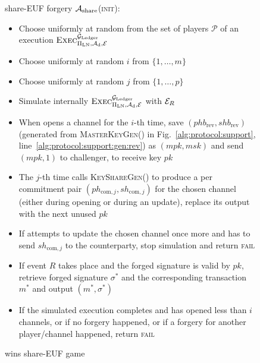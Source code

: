  \begin{figure}[!htbp]
    \begin{algobox}{\textsf{share-EUF} forgery}
      $\mathcal{A}_{\mathrm{share}}$(\textsc{init}):
      \begin{itemize}
        \item Choose uniformly at random \alice{} from the set of players
        $\mathcal{P}$ of an execution
        $\textsc{Exec}^{\mathcal{G}_{\mathrm{Ledger}}}_{\Pi_{\mathrm{LN}}, \mathcal{A}_{\mathrm{d}},
        \mathcal{E}}$
        \item Choose uniformly at random $i$ from $\{1, \dots, m\}$
        \item Choose uniformly at random $j$ from $\{1, \dots, p\}$
        \item Simulate internally
        $\textsc{Exec}^{\mathcal{G}_{\mathrm{Ledger}}}_{\Pi_{\mathrm{LN}}, \mathcal{A}_{\mathrm{d}},
        \mathcal{E}}$ with $\mathcal{E}_R$
        \item When \alice{} opens a channel for the $i$-th time,
        save $(phb_{\mathrm{rev}}, shb_{\mathrm{rev}})$ (generated from
        \textsc{MasterKeyGen}() in Fig.~\ref{alg:protocol:support},
        line~\ref{alg:protocol:support:gen:rev}) as $(mpk, msk)$ and send $(mpk,
        1)$ to challenger, to receive key $pk$
        \item The $j$-th time \alice{} calls \textsc{KeyShareGen}() to produce a
        per commitment pair $(ph_{\mathrm{com}, j}, sh_{\mathrm{com}, j})$ for
        the chosen channel (either during opening or during an update), replace
        its output with the next unused $pk$
        \item If \alice{} attempts to update the chosen channel once more and
        has to send $sh_{\mathrm{com}, j}$ to the counterparty, stop simulation
        and return \textsc{fail}
        \item If event $R$ takes place and the forged signature is valid by
        $pk$, retrieve forged signature $\sigma^*$ and the corresponding
        transaction $m^*$ and output $(m^*, \sigma^*)$
        \item If the simulated execution completes and \alice{} has opened less
        than $i$ channels, or if no forgery happened, or if a forgery for
        another player/channel happened, return \textsc{fail}
      \end{itemize}
    \end{algobox}
    \caption{wins \textsf{share-EUF} game}
    \label{alg:forge:share}
  \end{figure}

